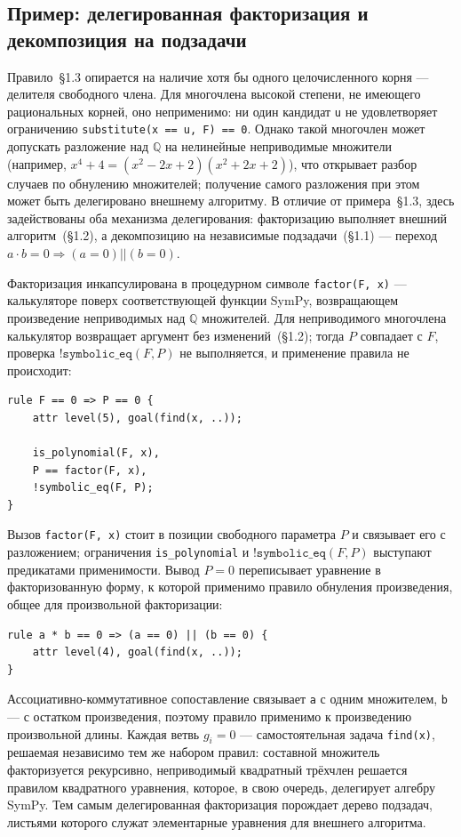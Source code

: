 \documentclass{intsys}
\begin{document}
\subsection{Пример: делегированная факторизация и декомпозиция на
подзадачи}

Правило~\S1.3 опирается на наличие хотя бы одного целочисленного
корня --- делителя свободного члена. Для многочлена высокой степени,
не имеющего рациональных корней, оно неприменимо: ни один кандидат
\texttt{u} не удовлетворяет ограничению \texttt{substitute(x == u, F)
== 0}. Однако такой многочлен может допускать разложение над
$\mathbb{Q}$ на нелинейные неприводимые множители (например,
$x^4 + 4 = (x^2 - 2x + 2)(x^2 + 2x + 2)$), что открывает разбор
случаев по обнулению множителей; получение самого разложения при этом
может быть делегировано внешнему алгоритму. В отличие от примера~\S1.3,
здесь задействованы оба механизма делегирования: факторизацию
выполняет внешний алгоритм~(\S1.2), а декомпозицию на независимые
подзадачи~(\S1.1) --- переход $a \cdot b = 0 \Rightarrow (a = 0)
\mathrel{||} (b = 0)$.

Факторизация инкапсулирована в процедурном символе
\texttt{factor(F, x)} --- калькуляторе поверх соответствующей функции
SymPy, возвращающем произведение неприводимых над $\mathbb{Q}$
множителей. Для неприводимого многочлена калькулятор возвращает
аргумент без изменений~(\S1.2); тогда $P$ совпадает с $F$, проверка
$\texttt{!symbolic\_eq}(F, P)$ не выполняется, и применение правила
не происходит:

\begin{lstlisting}
rule F == 0 => P == 0 {
    attr level(5), goal(find(x, ..));

    is_polynomial(F, x),
    P == factor(F, x),
    !symbolic_eq(F, P);
}
\end{lstlisting}

Вызов \texttt{factor(F, x)} стоит в позиции свободного параметра $P$
и связывает его с разложением; ограничения \texttt{is\_polynomial} и
$\texttt{!symbolic\_eq}(F, P)$ выступают предикатами применимости.
Вывод $P = 0$ переписывает уравнение в факторизованную форму, к
которой применимо правило обнуления произведения, общее для
произвольной факторизации:

\begin{lstlisting}
rule a * b == 0 => (a == 0) || (b == 0) {
    attr level(4), goal(find(x, ..));
}
\end{lstlisting}

Ассоциативно-коммутативное сопоставление связывает \texttt{a} с одним
множителем, \texttt{b} --- с остатком произведения, поэтому правило
применимо к произведению произвольной длины. Каждая ветвь $g_i = 0$
--- самостоятельная задача \texttt{find(x)}, решаемая независимо тем
же набором правил: составной множитель факторизуется рекурсивно,
неприводимый квадратный трёхчлен решается правилом квадратного
уравнения, которое, в свою очередь, делегирует алгебру SymPy. Тем
самым делегированная факторизация порождает дерево подзадач,
листьями которого служат элементарные уравнения для внешнего
алгоритма.
\end{document}
